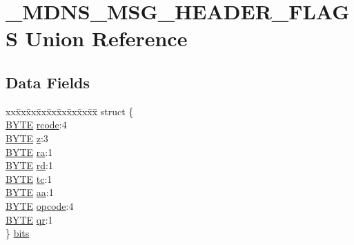\hypertarget{union___m_d_n_s___m_s_g___h_e_a_d_e_r___f_l_a_g_s}{}\section{\+\_\+\+M\+D\+N\+S\+\_\+\+M\+S\+G\+\_\+\+H\+E\+A\+D\+E\+R\+\_\+\+F\+L\+A\+G\+S Union Reference}
\label{union___m_d_n_s___m_s_g___h_e_a_d_e_r___f_l_a_g_s}
\subsection*{Data Fields}
\begin{DoxyCompactItemize}
\item 
\begin{tabbing}
xx\=xx\=xx\=xx\=xx\=xx\=xx\=xx\=xx\=\kill
struct \{\\
\>\hyperlink{_generic_type_defs_8h_a4ae1dab0fb4b072a66584546209e7d58}{BYTE} \hyperlink{union___m_d_n_s___m_s_g___h_e_a_d_e_r___f_l_a_g_s_a323fd6a79198bc22f31c9ea738772019}{rcode}:4\\
\>\hyperlink{_generic_type_defs_8h_a4ae1dab0fb4b072a66584546209e7d58}{BYTE} \hyperlink{union___m_d_n_s___m_s_g___h_e_a_d_e_r___f_l_a_g_s_a76f0f627efa15d3388e34f92ac635a94}{z}:3\\
\>\hyperlink{_generic_type_defs_8h_a4ae1dab0fb4b072a66584546209e7d58}{BYTE} \hyperlink{union___m_d_n_s___m_s_g___h_e_a_d_e_r___f_l_a_g_s_a7aac5175fb31a584ec71d07a1cb3b9e7}{ra}:1\\
\>\hyperlink{_generic_type_defs_8h_a4ae1dab0fb4b072a66584546209e7d58}{BYTE} \hyperlink{union___m_d_n_s___m_s_g___h_e_a_d_e_r___f_l_a_g_s_afbab9dfa9622855296f2b7fac9fb25c5}{rd}:1\\
\>\hyperlink{_generic_type_defs_8h_a4ae1dab0fb4b072a66584546209e7d58}{BYTE} \hyperlink{union___m_d_n_s___m_s_g___h_e_a_d_e_r___f_l_a_g_s_a754ef8a2470eedf7fbcb7019bf8e4245}{tc}:1\\
\>\hyperlink{_generic_type_defs_8h_a4ae1dab0fb4b072a66584546209e7d58}{BYTE} \hyperlink{union___m_d_n_s___m_s_g___h_e_a_d_e_r___f_l_a_g_s_afbb4ddf62c29332fa116d202b3717104}{aa}:1\\
\>\hyperlink{_generic_type_defs_8h_a4ae1dab0fb4b072a66584546209e7d58}{BYTE} \hyperlink{union___m_d_n_s___m_s_g___h_e_a_d_e_r___f_l_a_g_s_adac4f43aae2c6273a588415a1d769975}{opcode}:4\\
\>\hyperlink{_generic_type_defs_8h_a4ae1dab0fb4b072a66584546209e7d58}{BYTE} \hyperlink{union___m_d_n_s___m_s_g___h_e_a_d_e_r___f_l_a_g_s_a8aef8d54c024ebb23bd557b730554391}{qr}:1\\
\} \hyperlink{union___m_d_n_s___m_s_g___h_e_a_d_e_r___f_l_a_g_s_a10591b5d6e002c08a658907ccb7a420d}{bits}\\


\end{tabbing}
\end{DoxyCompactItemize}
